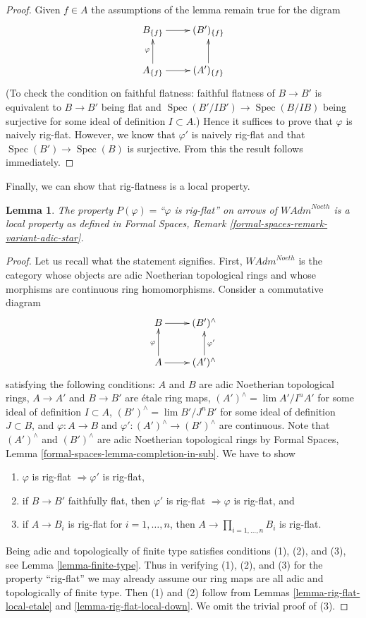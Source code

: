 \documentclass{stacks-project}
\theoremstyle{plain}
\newtheorem{lemma}[subsection]{Lemma}
\theoremstyle{definition}
\theoremstyle{remark}
\numberwithin{equation}{subsection}
\def\lim{\mathop{\mathrm{lim}}\nolimits}
\def\Spec{\mathop{\mathrm{Spec}}}
\begin{document}
\begin{proof}
Given $f \in A$ the assumptions of the lemma remain true for the digram
$$
\xymatrix{
B_{\{f\}} \ar[r] & (B')_{\{f\}} \\
A_{\{f\}} \ar[r] \ar[u]^\varphi & (A')_{\{f\}} \ar[u]
}
$$
(To check the condition on faithful flatness: faithful flatness
of $B \to B'$ is equivalent to $B \to B'$ being flat and
$\Spec(B'/IB') \to \Spec(B/IB)$ being
surjective for some ideal of definition $I \subset A$.)
Hence it suffices to prove that $\varphi$ is naively rig-flat.
However, we know that $\varphi'$ is naively rig-flat and
that $\Spec(B') \to \Spec(B)$ is surjective. From this the
result follows immediately.
\end{proof}

\noindent
Finally, we can show that rig-flatness is a local property.

\begin{lemma}
\label{lemma-rig-flat-axioms}
The property $P(\varphi)=$``$\varphi$ is rig-flat'' on arrows
of $\textit{WAdm}^{Noeth}$ is a local property as defined in
Formal Spaces, Remark \ref{formal-spaces-remark-variant-adic-star}.
\end{lemma}

\begin{proof}
Let us recall what the statement signifies. First, 
$\textit{WAdm}^{Noeth}$ is the category whose objects are
adic Noetherian topological rings and whose morphisms are
continuous ring homomorphisms. Consider a commutative diagram
$$
\xymatrix{
B \ar[r] & (B')^\wedge \\
A \ar[r] \ar[u]^\varphi & (A')^\wedge \ar[u]_{\varphi'}
}
$$
satisfying the following conditions:
$A$ and $B$ are adic Noetherian topological rings,
$A \to A'$ and $B \to B'$ are \'etale ring maps,
$(A')^\wedge = \lim A'/I^nA'$ for some ideal of definition $I \subset A$,
$(B')^\wedge = \lim B'/J^nB'$ for some ideal of definition $J \subset B$, and
$\varphi : A \to B$ and $\varphi' : (A')^\wedge \to (B')^\wedge$
are continuous. Note that $(A')^\wedge$ and $(B')^\wedge$ are
adic Noetherian topological rings by
Formal Spaces, Lemma \ref{formal-spaces-lemma-completion-in-sub}.
We have to show
\begin{enumerate}
\item $\varphi$ is rig-flat $\Rightarrow \varphi'$ is rig-flat,
\item if $B \to B'$ faithfully flat, then $\varphi'$ is rig-flat
$\Rightarrow \varphi$ is rig-flat, and
\item if $A \to B_i$ is rig-flat for $i = 1, \ldots, n$, then
$A \to \prod_{i = 1, \ldots, n} B_i$ is rig-flat.
\end{enumerate}
Being adic and topologically of finite type satisfies
conditions (1), (2), and (3), see Lemma \ref{lemma-finite-type}.
Thus in verifying (1), (2), and (3) for the property
``rig-flat'' we may already assume our ring maps are all adic
and topologically of finite type. Then (1) and (2) follow
from Lemmas \ref{lemma-rig-flat-local-etale} and
\ref{lemma-rig-flat-local-down}.
We omit the trivial proof of (3).
\end{proof}
\end{document}
